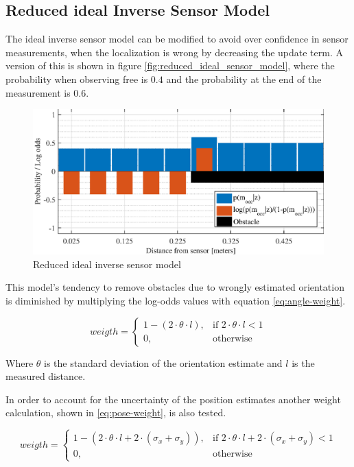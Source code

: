 \subsection{Reduced ideal Inverse Sensor Model}
\label{sec:reduced_ideal_sensor_model}
The ideal inverse sensor model can be modified to avoid over confidence in sensor measurements, when the localization is wrong by decreasing the update term. A version of this is shown in figure \vref{fig:reduced_ideal_sensor_model}, where the probability when observing free is $0.4$ and the probability at the end of the measurement is $0.6$. 
\begin{figure}[htbp]
	\centering
	\includegraphics[scale=1]{figures/static_mapping/reduced_ideal_sensor_model}
	\caption{Reduced ideal inverse sensor model}
	\label{fig:reduced_ideal_sensor_model}
\end{figure}
This model's tendency to remove obstacles due to wrongly estimated orientation is diminished by multiplying the log-odds values with equation \vref{eq:angle-weight}.

\begin{equation}
\label{eq:angle-weight}
weigth = 
\begin{cases}
1 - ( 2 \cdot \theta \cdot l ), & \text{if } 2 \cdot \theta \cdot l < 1\\
0, & \text{otherwise}
\end{cases}
\end{equation}

Where \(\theta \) is the standard deviation of the orientation estimate and \(l\) is the measured distance.

In order to account for the uncertainty of the position estimates another weight calculation, shown in \vref{eq:pose-weight}, is also tested.

\begin{equation}
\label{eq:pose-weight}
weigth = 
\begin{cases}
1 - ( 2 \cdot \theta \cdot l + 2 \cdot (\sigma_x + \sigma_y) ), & \text{if } 2 \cdot \theta \cdot l + 2 \cdot (\sigma_x + \sigma_y) < 1\\
0, & \text{otherwise}
\end{cases}
\end{equation}

